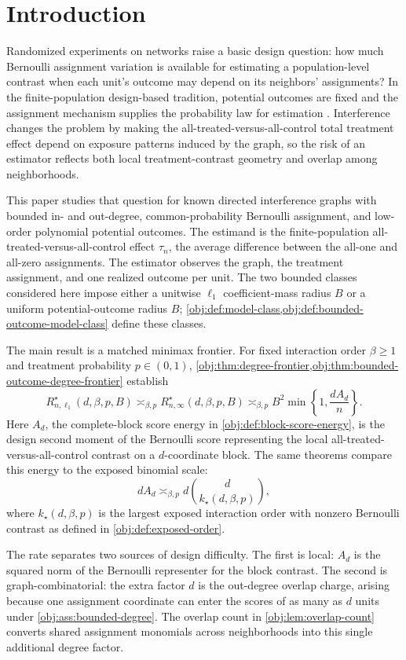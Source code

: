\documentclass[11pt]{article}
\begin{document}
\section{Introduction}

Randomized experiments on networks raise a basic design question: how much Bernoulli assignment variation is available for estimating a population-level contrast when each unit's outcome may depend on its neighbors' assignments? In the finite-population design-based tradition, potential outcomes are fixed and the assignment mechanism supplies the probability law for estimation \citep{HorvitzThompson1952,Rubin1978,ImbensRubin2015}. Interference changes the problem by making the all-treated-versus-all-control total treatment effect depend on exposure patterns induced by the graph, so the risk of an estimator reflects both local treatment-contrast geometry and overlap among neighborhoods.

This paper studies that question for known directed interference graphs with bounded in- and out-degree, common-probability Bernoulli assignment, and low-order polynomial potential outcomes. The estimand is the finite-population all-treated-versus-all-control effect \(\tau_n\), the average difference between the all-one and all-zero assignments. The estimator observes the graph, the treatment assignment, and one realized outcome per unit. The two bounded classes considered here impose either a unitwise \(\ell_1\) coefficient-mass radius \(B\) or a uniform potential-outcome radius \(B\); \cref{obj:def:model-class,obj:def:bounded-outcome-model-class} define these classes.

The main result is a matched minimax frontier. For fixed interaction order \(\beta\ge1\) and treatment probability \(p\in(0,1)\), \cref{obj:thm:degree-frontier,obj:thm:bounded-outcome-degree-frontier} establish
\[
R_{n,\ell_1}^{\star}(d,\beta,p,B)
\asymp_{\beta,p}
R_{n,\infty}^{\star}(d,\beta,p,B)
\asymp_{\beta,p}
B^2\min\!\left\{1,\frac{dA_d}{n}\right\}.
\]
Here \(A_d\), the complete-block score energy in \cref{obj:def:block-score-energy}, is the design second moment of the Bernoulli score representing the local all-treated-versus-all-control contrast on a \(d\)-coordinate block. The same theorems compare this energy to the exposed binomial scale:
\[
dA_d\asymp_{\beta,p}d\binom d{k_\star(d,\beta,p)},
\]
where \(k_\star(d,\beta,p)\) is the largest exposed interaction order with nonzero Bernoulli contrast as defined in \cref{obj:def:exposed-order}.

The rate separates two sources of design difficulty. The first is local: \(A_d\) is the squared norm of the Bernoulli representer for the block contrast. The second is graph-combinatorial: the extra factor \(d\) is the out-degree overlap charge, arising because one assignment coordinate can enter the scores of as many as \(d\) units under \cref{obj:ass:bounded-degree}. The overlap count in \cref{obj:lem:overlap-count} converts shared assignment monomials across neighborhoods into this single additional degree factor.
\end{document}
